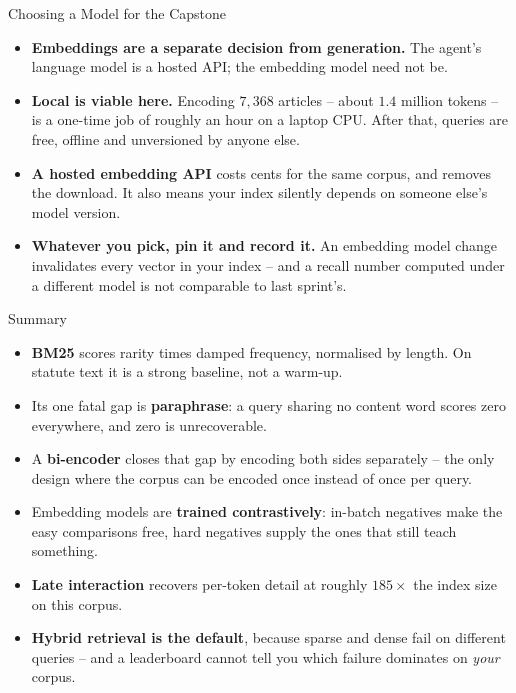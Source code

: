 \begin{frame}{Choosing a Model for the Capstone}
\begin{itemize}
  \item \textbf{Embeddings are a separate decision from generation.} The agent's language model is a hosted API; the embedding model need not be.
  \pause
  \item \textbf{Local is viable here.} Encoding $7{,}368$ articles -- about $1.4$ million tokens -- is a one-time job of roughly an hour on a laptop CPU. After that, queries are free, offline and unversioned by anyone else.
  \pause
  \item \textbf{A hosted embedding API} costs cents for the same corpus, and removes the download. It also means your index silently depends on someone else's model version.
  \pause
  \item \textbf{Whatever you pick, pin it and record it.} An embedding model change invalidates every vector in your index -- and a recall number computed under a different model is not comparable to last sprint's.
\end{itemize}
\end{frame}

\begin{frame}{Summary}
\begin{itemize}
  \item \textbf{BM25} scores rarity times damped frequency, normalised by length. On statute text it is a strong baseline, not a warm-up.
  \pause
  \item Its one fatal gap is \textbf{paraphrase}: a query sharing no content word scores zero everywhere, and zero is unrecoverable.
  \pause
  \item A \textbf{bi-encoder} closes that gap by encoding both sides separately -- the only design where the corpus can be encoded once instead of once per query.
  \pause
  \item Embedding models are \textbf{trained contrastively}: in-batch negatives make the easy comparisons free, hard negatives supply the ones that still teach something.
  \pause
  \item \textbf{Late interaction} recovers per-token detail at roughly $185\times$ the index size on this corpus.
  \pause
  \item \textbf{Hybrid retrieval is the default}, because sparse and dense fail on different queries -- and a leaderboard cannot tell you which failure dominates on \emph{your} corpus.
\end{itemize}
\end{frame}

